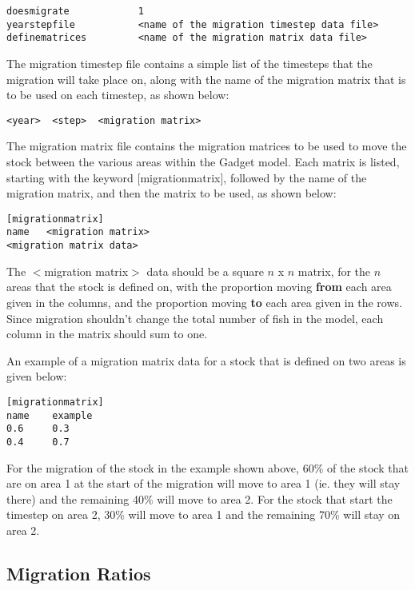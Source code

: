 \documentclass[]{book}
\begin{document}
\begin{verbatim}
doesmigrate            1
yearstepfile           <name of the migration timestep data file>
definematrices         <name of the migration matrix data file>
\end{verbatim}

The migration timestep file contains a simple list of the timesteps that
the migration will take place on, along with the name of the migration
matrix that is to be used on each timestep, as shown below:

\begin{verbatim}
<year>  <step>  <migration matrix>
\end{verbatim}

The migration matrix file contains the migration matrices to be used to
move the stock between the various areas within the Gadget model. Each
matrix is listed, starting with the keyword {[}migrationmatrix{]},
followed by the name of the migration matrix, and then the matrix to be
used, as shown below:

\begin{verbatim}
[migrationmatrix]
name   <migration matrix>
<migration matrix data>
\end{verbatim}

The \(<\)migration matrix\(>\) data should be a square \(n\) x \(n\) matrix, for
the \(n\) areas that the stock is defined on, with the proportion moving
\textbf{from} each area given in the columns, and the proportion moving
\textbf{to} each area given in the rows. Since migration shouldn't change the
total number of fish in the model, each column in the matrix should sum
to one.

An example of a migration matrix data for a stock that is defined on two
areas is given below:

\begin{verbatim}
[migrationmatrix]
name    example
0.6     0.3
0.4     0.7
\end{verbatim}

For the migration of the stock in the example shown above, 60\% of the
stock that are on area 1 at the start of the migration will move to area
1 (ie. they will stay there) and the remaining 40\% will move to area 2.
For the stock that start the timestep on area 2, 30\% will move to area 1
and the remaining 70\% will stay on area 2.

\hypertarget{migration-ratios}{%
\subsection{Migration Ratios}\label{migration-ratios}}
\end{document}

